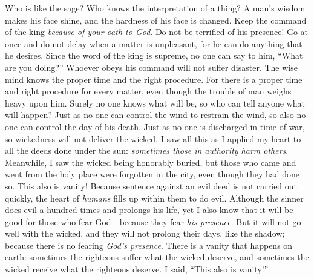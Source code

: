\begin{biblechapter} %
 Who is like the sage? 
Who knows the interpretation of a thing? 
A man’s wisdom makes his face shine, 
and the hardness of his face is changed.
\verse Keep the command of the king 
\textit{because of your oath to God}.
\verse Do not be terrified of his presence! 
Go at once and do not delay when a matter is unpleasant, 
for he can do anything that he desires.
\verse Since the word of the king is supreme, 
no one can say to him, “What are you doing?”
\verse Whoever obeys his command will not suffer disaster. 
The wise mind knows the proper time and the right procedure.
\verse For there is a proper time and right procedure for every matter, 
even though the trouble of man weighs heavy upon him.
 Surely no one knows what will be, 
so who can tell anyone what will happen?
\verse Just as no one can control the wind to restrain the wind, 
so also no one can control the day of his death. 
Just as no one is discharged in time of war, 
so wickedness will not deliver the wicked.
 I saw all this as I applied my heart to all the deeds done under the sun: \textit{sometimes those in authority harm others}.
\verse Meanwhile, I saw the wicked being honorably buried, but those who came and went from the holy place were forgotten in the city, even though they had done so. This also is vanity!
 Because sentence against an evil deed is not carried out quickly, the heart of \textit{humans} fills up within them to do evil.
\verse Although the sinner does evil a hundred times and prolongs his life, yet I also know that it will be good for those who fear God—because they fear \textit{his presence}.
\verse But it will not go well with the wicked, and they will not prolong their days, like the shadow; because there is no fearing \textit{God’s presence}.
\verse There is a vanity that happens on earth: sometimes the righteous suffer what the wicked deserve, and sometimes the wicked receive what the righteous deserve. I said, “This also is vanity!”

\end{biblechapter}

